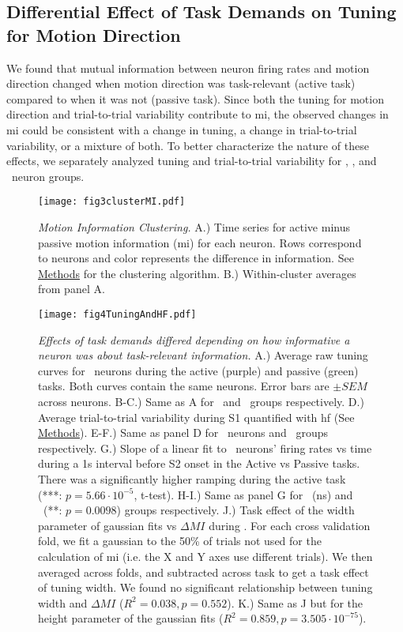 \subsection*{Differential Effect of Task Demands on Tuning for Motion Direction}
We found that mutual information between neuron firing rates and motion direction changed when motion direction was task-relevant (active task) compared to when it was not (passive task). Since both the tuning for motion direction and trial-to-trial variability contribute to \gls{mi}, the observed changes in \gls{mi} could be consistent with a change in tuning, a change in trial-to-trial variability, or a mixture of both. To better characterize the nature of these effects, we separately analyzed tuning and trial-to-trial variability for \enhanced, \suppressed, and \consistent\ neuron groups.


	\begin{figure}
		\captionsetup{singlelinecheck = false, font=footnotesize, labelsep=space}
		\centering
		\texttt{[image: fig3clusterMI.pdf]}
		\caption{{\it Motion Information Clustering.} A.) Time series for active minus passive motion information (\gls{mi}) for each neuron. Rows correspond to neurons and color represents the difference in information. See \hyperref[{sec:methods}]{Methods} for the clustering algorithm. B.) Within-cluster averages from panel A.}
		\label{fig:MI}
	\end{figure}



	\begin{figure}
		\centering
		\captionsetup{singlelinecheck = false, font=footnotesize, labelsep=space}
		\texttt{[image: fig4TuningAndHF.pdf]}
		\caption{{\it Effects of task demands differed depending on how informative a neuron was about task-relevant information.} A.) Average raw tuning curves for \enhanced\ neurons during the active (purple) and passive (green) tasks. Both curves contain the same neurons. Error bars are $\pm SEM$ across neurons. B-C.) Same as A for \suppressed\ and \consistent\ groups respectively. D.) Average trial-to-trial variability during S1 quantified with \gls{hf} (See \hyperref[{sec:methods}]{Methods}). E-F.) Same as panel D for \suppressed\ neurons and \consistent\ groups respectively. G.) Slope of a linear fit to \enhanced\ neurons' firing rates vs time during a 1s interval before S2 onset in the Active vs Passive tasks. There was a significantly higher ramping during the active task (***: $p=5.66\cdot10^{-5}$, t-test). H-I.) Same as panel G for \suppressed\ (ns) and \consistent\ (**: $p=0.0098$) groups respectively. J.) Task effect of the width parameter of gaussian fits vs $\Delta MI$ during \sample. For each cross validation fold, we fit a gaussian to the 50\% of trials not used for the calculation of \gls{mi} (i.e. the X and Y axes use different trials). We then averaged across folds, and subtracted across task to get a task effect of tuning width. We found no significant relationship between tuning width and $\Delta MI$ ($R^2=0.038, p=0.552$). K.) Same as J but for the height parameter of the gaussian fits ($R^2=0.859, p=3.505 \cdot 10^{-75}$). }
		\label{fig:interaction}
	\end{figure}



